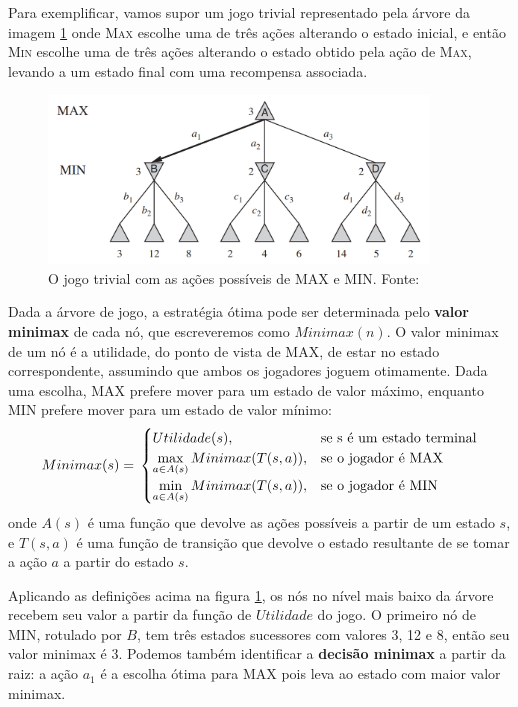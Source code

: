 Para exemplificar, vamos supor um jogo trivial representado pela árvore da imagem \ref{minimax} onde \textsc{Max} escolhe uma de três ações alterando o estado inicial, e então \textsc{Min} escolhe uma de três ações alterando o estado obtido pela ação de \textsc{Max}, levando a um estado final com uma recompensa associada.

\begin{figure}[!h]
        \centering
            \includegraphics[width=0.9\textwidth]{picstcc/minimax.png}
            \caption{O jogo trivial com as ações possíveis de MAX e MIN. Fonte: \cite[p. 164]{livro}}
            \label{minimax}
\end{figure}

Dada a árvore de jogo, a estratégia ótima pode ser determinada pelo \textbf{valor minimax} de cada nó, que escreveremos como $Minimax(n)$. O valor minimax de um nó é a utilidade, do ponto de vista de MAX, de estar no estado correspondente, assumindo que ambos os jogadores joguem otimamente. Dada uma escolha, MAX prefere mover para um estado de valor máximo, enquanto MIN prefere mover para um estado de valor mínimo:
\begin{equation*}
  Minimax(s) = \\
  \begin{cases} Utilidade(s), &\textrm{se s é um estado terminal}\\
                \max\limits_{a\in A(s)}Minimax(T(s,a)), &\textrm{se o jogador é MAX}\\
                \min\limits_{a\in A(s)}Minimax(T(s,a)), &\textrm{se o jogador é MIN}\\
  \end{cases}
\end{equation*}
onde $A(s)$ é uma função que devolve as ações possíveis a partir de um estado $s$, e $T(s, a)$ é uma função de transição que devolve o estado resultante de se tomar a ação $a$ a partir do estado $s$.

Aplicando as definições acima na figura \ref{minimax}, os nós no nível mais baixo da árvore recebem seu valor a partir da função de $Utilidade$ do jogo. O primeiro nó de MIN, rotulado por $B$, tem três estados sucessores com valores 3, 12 e 8, então seu valor minimax é 3. Podemos também identificar a \textbf{decisão minimax} a partir da raiz: a ação $a_1$ é a escolha ótima para MAX pois leva ao estado com maior valor minimax.
